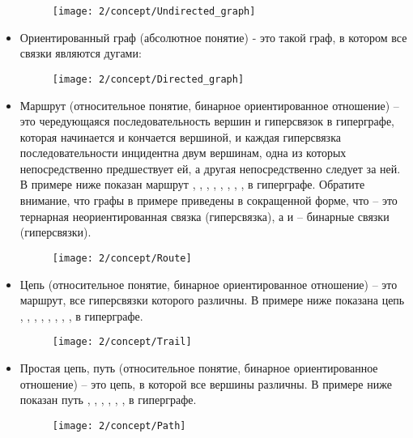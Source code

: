 \begin{itemize}
  \begin{figure}[h!]
    \centering
    \texttt{[image: 2/concept/Undirected\_graph]}
    \label{fig:Concept_Undirected_graph}
  \end{figure}

\newpage
 
\item Ориентированный граф (абсолютное понятие) - это такой граф, в
  котором все связки являются дугами:

  \begin{figure}[h!]
    \centering
    \texttt{[image: 2/concept/Directed\_graph]}
    \label{fig:Concept_Directed_graph}
  \end{figure}

\newpage
 
\item Маршрут (относительное понятие, бинарное ориентированное
  отношение) – это чередующаяся последовательность вершин и
  гиперсвязок в гиперграфе, которая начинается и кончается вершиной, и
  каждая гиперсвязка последовательности инцидентна двум вершинам, одна
  из которых непосредственно предшествует ей, а другая непосредственно
  следует за ней. В примере ниже показан маршрут ,
  , , , , , ,
  ,  в гиперграфе. Обратите внимание, что графы в
  примере приведены в сокращенной форме, что  – это
  тернарная неориентированная связка (гиперсвязка), а  и
   – бинарные связки (гиперсвязки).

  \begin{figure}[h!]
    \centering
    \texttt{[image: 2/concept/Route]}
    \label{fig:Concept_Route}
  \end{figure}

\newpage
 
\item Цепь (относительное понятие, бинарное ориентированное отношение)
  – это маршрут, все гиперсвязки которого различны. В примере ниже
  показана цепь , , , ,
  , , , ,  в гиперграфе.

  \begin{figure}[h!]
    \centering
    \texttt{[image: 2/concept/Trail]}
    \label{fig:Concept_Trail}
  \end{figure}

\newpage
 
\item Простая цепь, путь (относительное понятие, бинарное
  ориентированное отношение) – это цепь, в которой все вершины
  различны. В примере ниже показан путь , ,
  , , , ,  в гиперграфе.

  \begin{figure}[h!]
    \centering
    \texttt{[image: 2/concept/Path]}
    \label{fig:Concept_Path}
  \end{figure}

\end{itemize}

